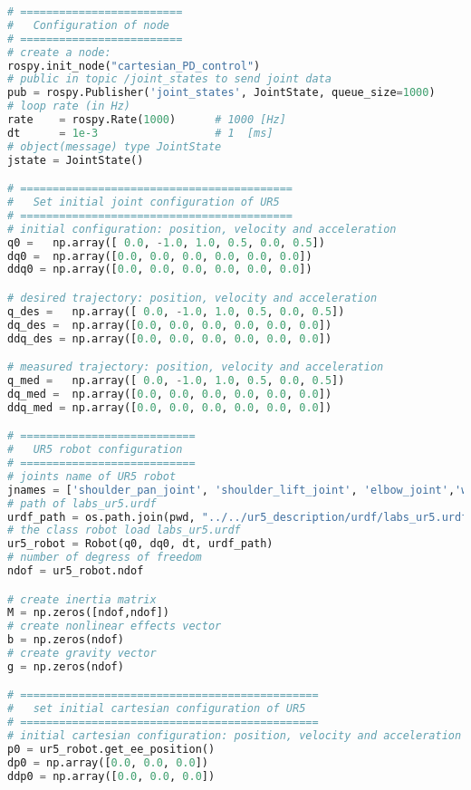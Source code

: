 \begin{lstlisting}[language=Python,caption={Move the ur5 robot end-effector using the Cartesian proportional-derivative control method, \eqref{eq:cartesian_PD}, so that it follows the Cartesian sinusoidal reference trajectory of activity \ref{subsec:generate_sinusoidal_reference}.}, label={lst:cartesian_PD}]
# =========================
#   Configuration of node
# =========================
# create a node: 
rospy.init_node("cartesian_PD_control")
# public in topic /joint_states	to send joint data	
pub = rospy.Publisher('joint_states', JointState, queue_size=1000)
# loop rate (in Hz)
rate 	= rospy.Rate(1000)		# 1000 [Hz]
dt 		= 1e-3					# 1  [ms]
# object(message) type JointState
jstate = JointState()

# ==========================================
#   Set initial joint configuration of UR5
# ==========================================
# initial configuration: position, velocity and acceleration 
q0 =   np.array([ 0.0, -1.0, 1.0, 0.5, 0.0, 0.5])
dq0 =  np.array([0.0, 0.0, 0.0, 0.0, 0.0, 0.0]) 
ddq0 = np.array([0.0, 0.0, 0.0, 0.0, 0.0, 0.0]) 

# desired trajectory: position, velocity and acceleration
q_des =   np.array([ 0.0, -1.0, 1.0, 0.5, 0.0, 0.5])
dq_des =  np.array([0.0, 0.0, 0.0, 0.0, 0.0, 0.0]) 
ddq_des = np.array([0.0, 0.0, 0.0, 0.0, 0.0, 0.0]) 

# measured trajectory: position, velocity and acceleration
q_med =   np.array([ 0.0, -1.0, 1.0, 0.5, 0.0, 0.5])
dq_med =  np.array([0.0, 0.0, 0.0, 0.0, 0.0, 0.0]) 
ddq_med = np.array([0.0, 0.0, 0.0, 0.0, 0.0, 0.0]) 

# ===========================
#   UR5 robot configuration
# ===========================
# joints name of UR5 robot
jnames = ['shoulder_pan_joint', 'shoulder_lift_joint', 'elbow_joint','wrist_1_joint', 'wrist_2_joint', 'wrist_3_joint']
# path of labs_ur5.urdf
urdf_path = os.path.join(pwd, "../../ur5_description/urdf/labs_ur5.urdf")
# the class robot load labs_ur5.urdf
ur5_robot = Robot(q0, dq0, dt, urdf_path)
# number of degress of freedom
ndof = ur5_robot.ndof

# create inertia matrix 
M = np.zeros([ndof,ndof])
# create nonlinear effects vector
b = np.zeros(ndof)
# create gravity vector
g = np.zeros(ndof)

# ==============================================
#   set initial cartesian configuration of UR5
# ==============================================
# initial cartesian configuration: position, velocity and acceleration
p0 = ur5_robot.get_ee_position()
dp0 = np.array([0.0, 0.0, 0.0])
ddp0 = np.array([0.0, 0.0, 0.0])


\end{lstlisting}

